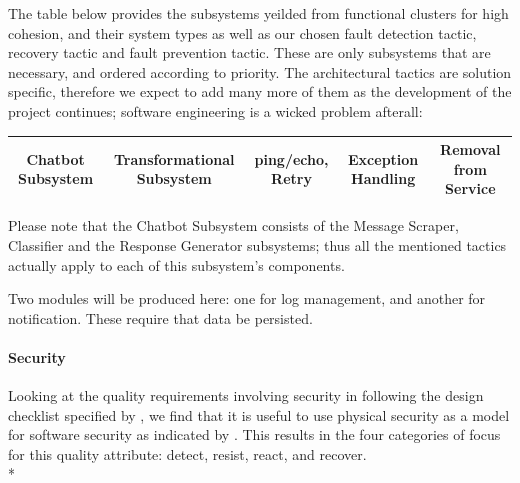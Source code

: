 \documentclass[11pt]{article}
\begin{document}
The table below provides the subsystems yeilded from functional clusters for high cohesion, and their system types as well as our chosen fault detection tactic, recovery tactic and fault prevention tactic. These are only subsystems that are necessary, and ordered according to priority. The architectural tactics are solution specific, therefore we expect to add many more of them as the development of the project continues; software engineering is a wicked problem afterall:

\begin{center}
	\begin{tabular}{|c|c|c|c|c|}
		\hline
		Chatbot Subsystem & Transformational Subsystem & ping/echo, Retry & Exception Handling & Removal from Service\\
		\hline
	\end{tabular}	
\end{center}
Please note that the Chatbot Subsystem consists of the Message Scraper, Classifier and the Response Generator subsystems; thus all the mentioned tactics actually apply to each of this subsystem's components.

Two modules will be produced here: one for log management, and another for notification. These require that data be persisted.

\paragraph{Security}
Looking at the quality requirements involving security in following the design checklist specified by \cite{Book:1}, we find that it is useful to use physical security as a model for software security as indicated by \cite{Book:2}. This results in the four categories of focus for this quality attribute: detect, resist, react, and recover. \\*
\end{document}
